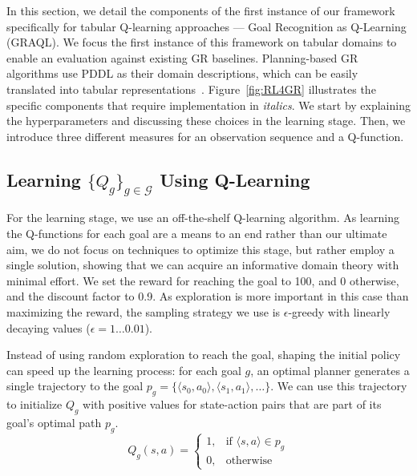 \documentclass[letterpaper]{article} %
\providecommand\goals{\mathcal{G}}
\begin{document}
In this section, we detail the components of the first instance of our framework specifically for tabular Q-learning approaches --- Goal Recognition as Q-Learning (GRAQL).
We focus the first instance of this framework on tabular domains to enable an evaluation against existing GR baselines. Planning-based GR algorithms use PDDL as their domain descriptions, which can be easily translated into tabular representations~\cite{ramirez2009plan,amado2018goal}.
Figure~\ref{fig:RL4GR} illustrates the specific components that require implementation in \textit{italics}.
We start by explaining the hyperparameters and discussing these choices in the learning stage.
Then, we introduce three different measures for an observation sequence and a Q-function.

\subsection{Learning $\{Q_g\}_{g\in \goals}$ Using Q-Learning}
For the learning stage, we use an off-the-shelf Q-learning algorithm.
As learning the Q-functions for each goal are a means to an end rather than our ultimate aim, we do not focus on techniques to optimize this stage, but rather employ a single solution, showing that we can acquire an informative domain theory with minimal effort.
We set the reward for reaching the goal to 100, and 0 otherwise, and the discount factor to 0.9.
As exploration is more important in this case than maximizing the reward, the sampling strategy we use is $\epsilon$-greedy with linearly decaying values ($\epsilon = 1 \ldots 0.01$).

Instead of using random exploration to reach the goal, shaping the initial policy can speed up the learning process: for each goal $g$, an optimal planner generates a single trajectory to the goal $p_g = \{\langle s_0, a_0 \rangle, \langle s_1, a_1 \rangle, \ldots \}$.
We can use this trajectory to initialize $Q_g$ with positive values for state-action pairs that are part of its goal's optimal path $p_g$.
%
\begin{equation}
    Q_g(s,a) =
    \begin{cases}
    1,& \text{if } \langle s,a \rangle \in p_g \\
    0,              & \text{otherwise}
\end{cases}
\end{equation}
\end{document}
